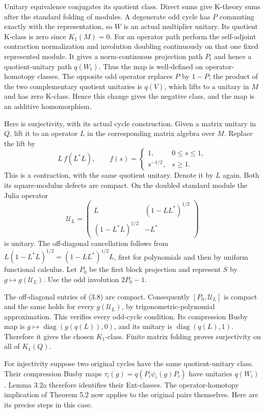 \documentclass[
  11pt,
]{article}
\begin{document}
Unitary equivalence conjugates its quotient class. Direct sums give
K-theory sums after the standard folding of modules. A degenerate odd
cycle has \(P\) commuting exactly with the representation, so \(W\) is
an actual multiplier unitary. Its quotient K-class is zero since
\(K_1(M)=0\). For an operator path perform the self-adjoint contraction
normalization and involution doubling continuously on that one fixed
represented module. It gives a norm-continuous projection path \(P_t\)
and hence a quotient-unitary path \(q(W_t)\). Thus the map is
well-defined on operator-homotopy classes. The opposite odd operator
replaces \(P\) by \(1-P\); the product of the two complementary quotient
unitaries is \(q(V)\), which lifts to a unitary in \(M\) and has zero
K-class. Hence this change gives the negative class, and the map is an
additive homomorphism.

Here is surjectivity, with its actual cycle construction. Given a matrix
unitary in \(Q\), lift it to an operator \(L\) in the corresponding
matrix algebra over \(M\). Replace the lift by \[
L\,f(L^*L),\qquad
f(s)=
\begin{cases}1,&0\leq s\leq1,\\s^{-1/2},&s\geq1.\end{cases}
\tag{3.7}
\] This is a contraction, with the same quotient unitary. Denote it by
\(L\) again. Both its square-modulus defects are compact. On the doubled
standard module the Julia operator \[
\mathcal U_L=
\begin{pmatrix}
L&(1-LL^*)^{1/2}\\
(1-L^*L)^{1/2}&-L^*
\end{pmatrix}
\tag{3.8}
\] is unitary. The off-diagonal cancellation follows from
\(L(1-L^*L)^{1/2}=(1-LL^*)^{1/2}L\), first for polynomials and then by
uniform functional calculus. Let \(P_0\) be the first block projection
and represent \(S\) by \(g\mapsto g(\mathcal U_L)\). Use the odd
involution \(2P_0-1\).

The off-diagonal entries of (3.8) are compact. Consequently
\([P_0,\mathcal U_L]\) is compact and the same holds for every
\(g(\mathcal U_L)\), by trigonometric-polynomial approximation. This
verifies every odd-cycle condition. Its compression Busby map is
\(g\mapsto\operatorname{diag}(g(q(L)),0)\), and its unitary is
\(\operatorname{diag}(q(L),1)\). Therefore it gives the chosen
\(K_1\)-class. Finite matrix folding proves surjectivity on all of
\(K_1(Q)\).

For injectivity suppose two original cycles have the same
quotient-unitary class. Their compression Busby maps
\(\tau_i(g)=q(P_i\psi_i(g)P_i)\) have unitaries \(q(W_i)\). Lemma 3.2a
therefore identifies their Ext-classes. The operator-homotopy
implication of Theorem 5.2 now applies to the original pairs themselves.
Here are its precise steps in this case.
\end{document}
